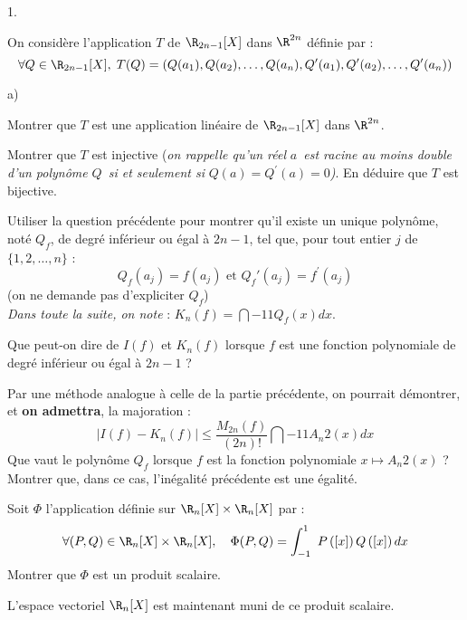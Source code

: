 \documentclass[11pt]{article}%
\begin{document}
\begin{noliste}{1.}
 \setlength{\itemsep}{4mm}
\item On considère l'application $T$ de $\R_{2n-1}[X]$ dans $\R^{2n}$
définie par : 
\[
\forall Q\in \R_{2n-1}[X],\;T(Q) =
(Q(a_{1}),Q(a_{2}),\dots,Q(a_{n}),Q^{\prime }(a_{1}),Q^{\prime
}(a_{2}),\dots,Q^{\prime }(a_{n}))
\]

\begin{noliste}{a)}
 \setlength{\itemsep}{2mm}
\item Montrer que $T$ est une application linéaire de $\R_{2n-1}[X]$
dans $\R^{2n}$.

\item Montrer que $T$ est injective (\textit{on rappelle qu'un réel
}$a$\textit{\ est racine au moins double d'un polynôme }$Q$\textit{\ si
et
seulement si }$Q(a) = Q^{\prime }(a) = 0$\textit{)}. En déduire que $T$
est
bijective.

\item Utiliser la question précédente pour montrer qu'il existe un
unique
polynôme, noté $Q_{f}$, de degré inférieur ou égal à $2n-1$, tel que,
pour
tout entier $j$ de $\{1,2,\dots,n\}$ : 
\[
Q_{f}(a_{j}) = f(a_{j})\text{ et }Q_{f}{\prime }(a_{j}) = f^{\prime
}(a_{j})
\]
(on ne demande pas d'expliciter $Q_{f}$)\\
\textit{Dans toute la suite, on note } : $K_{n}(f) =
\dint{-1}{1}Q_{f}(x)dx$.
\end{noliste}

\item Que peut-on dire de $I(f)$ et $K_{n}(f)$ lorsque $f$ est une
fonction
polynomiale de degré inférieur ou égal à $2n-1$ ?

\item Par une méthode analogue à celle de la partie précédente, on
pourrait démontrer, et \textbf{on admettra}, la majoration : 
\[
\left| I(f)-K_{n}(f)\right| \leq
\dfrac{M_{2n}(f)}{(2n)!}\dint{-1}{1}A_{n}{2}(x)dx
\]
Que vaut le polynôme $Q_{f}$ lorsque $f$ est la fonction polynomiale
$x\mapsto A_{n}{2}(x)$ ?\\
Montrer que, dans ce cas, l'inégalité précédente est une égalité.

\item Soit $\Phi $ l'application définie sur $\R_{n}[X]\times 
\R_{n}[X]$ par : 
\[
\forall (P,Q)\in \R_{n}[X]\times \R_{n}[X],\quad \Phi
(P,Q) = \dint{-1}{1}P\left(\Ev{x}\right)Q\left(\Ev{x}\right)dx
\]
Montrer que $\Phi $ est un produit scalaire.

\item L'espace vectoriel $\R_{n}[X]$ est maintenant muni de ce
produit scalaire.


\end{noliste}
\end{document}
